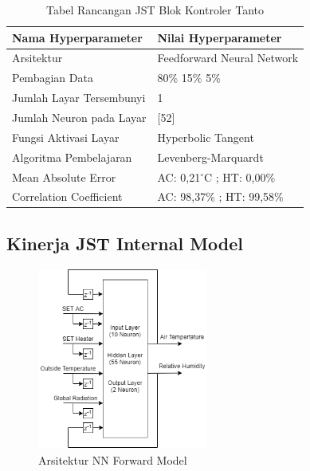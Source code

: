 \begin{table}[!h]
	\caption{Tabel Rancangan JST Blok Kontroler Tanto}
	\label{tbl:5:NNcontrol}
	\centering
	\begin{tabular}{|p{5.7cm}|p{5cm}|}
		\hline
		\textbf{Nama Hyperparameter} & \textbf{Nilai Hyperparameter} \\ \hline
		Arsitektur & Feedforward Neural Network \\ \hline
		Pembagian Data & 80\% 15\% 5\% \\ \hline 
		Jumlah Layar Tersembunyi & 1 \\ \hline
		Jumlah Neuron pada Layar & [52] \\ \hline
		Fungsi Aktivasi Layar & Hyperbolic Tangent \\ \hline
		Algoritma Pembelajaran & Levenberg-Marquardt \\ \hline
		Mean Absolute Error & AC: 0,21$^\circ$C ; HT: 0,00\% \\ \hline
		Correlation Coefficient & AC: 98,37\% ; HT: 99,58\% \\ \hline
	\end{tabular}
\end{table}

\subsection{Kinerja JST Internal Model}

\begin{figure}[!hbt]
	\centering
	\includegraphics[width=0.5\textwidth]{figures/NNForwardModelDesign}
	\caption{Arsitektur NN Forward Model}
	\label{fig:5:NNForwardModelDesign}
\end{figure}

